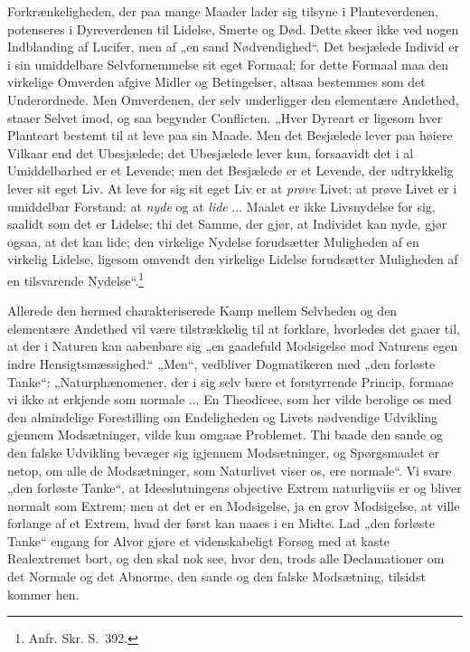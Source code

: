 \documentclass[12pt]{book}
\newcommand{\opage}[1]{\marginnote{\footnotesize\textit{[#1]}}}
\begin{document}
Forkrænkeligheden, der paa mange Maader lader sig tilsyne i Planteverdenen, potenseres i Dyreverdenen til Lidelse, Smerte og Død. Dette skeer ikke ved nogen Indblanding af Lucifer, men af „en sand Nødvendighed“. Det besjælede Individ er i sin umiddelbare Selvfornemmelse sit eget Formaal; for dette Formaal maa den virkelige Omverden afgive Midler og Betingelser, altsaa bestemmes som det Underordnede. Men Omverdenen, der selv underligger den elementære
\opage{454}Andethed, staaer Selvet imod, og saa begynder Conflicten. „Hver Dyreart er ligesom hver Planteart bestemt til at leve paa sin Maade. Men det Besjælede lever paa høiere Vilkaar end det Ubesjælede; det Ubesjælede lever kun, forsaavidt det i al Umiddelbarhed er et Levende; men det Besjælede er et Levende, der udtrykkelig lever sit eget Liv. At leve for sig sit eget Liv er at \emph{prøve} Livet; at prøve Livet er i umiddelbar Forstand: at \emph{nyde} og at \emph{lide} ... Maalet er ikke Livsnydelse for sig, saalidt som det er Lidelse; thi det Samme, der gjør, at Individet kan nyde, gjør ogsaa, at det kan lide; den virkelige Nydelse forudsætter Muligheden af en virkelig Lidelse, ligesom omvendt den virkelige Lidelse forudsætter Muligheden af en tilsvarende Nydelse“.\footnote{Anfr. Skr. S.~392.}%

Allerede den hermed charakteriserede Kamp mellem Selvheden og den elementære Andethed vil være tilstrækkelig til at forklare, hvorledes det gaaer til, at der i Naturen kan aabenbare sig „en gaadefuld Modsigelse mod Naturens egen indre Hensigtsmæssighed.“ „Men“, vedbliver Dogmatikeren med „den forløste Tanke“: „Naturphænomener, der i sig selv bære et forstyrrende Princip, formaae vi ikke at erkjende som normale ... En Theodicee, som her vilde berolige os med den almindelige Forestilling om Endeligheden og Livets nødvendige Udvikling gjennem Modsætninger, vilde kun omgaae Problemet. Thi baade den sande og den falske Udvikling bevæger sig igjennem Modsætninger, og Spørgsmaalet er netop, om alle de Modsætninger, som Naturlivet viser os, ere normale“. Vi svare „den forløste Tanke“, at Ideeslutningens objective Extrem naturligviis er og bliver normalt som Extrem; men at det er en Modsigelse, ja en grov Modsigelse, at ville forlange af et Extrem, hvad der først kan naaes i en Midte. Lad „den forløste Tanke“ engang for Alvor gjøre et videnskabeligt Forsøg med at kaste Realextremet bort, og den skal
\opage{455}nok see, hvor den, trods alle Declamationer om det Normale og det Abnorme, den sande og den falske Modsætning, tilsidst kommer hen.
\end{document}
